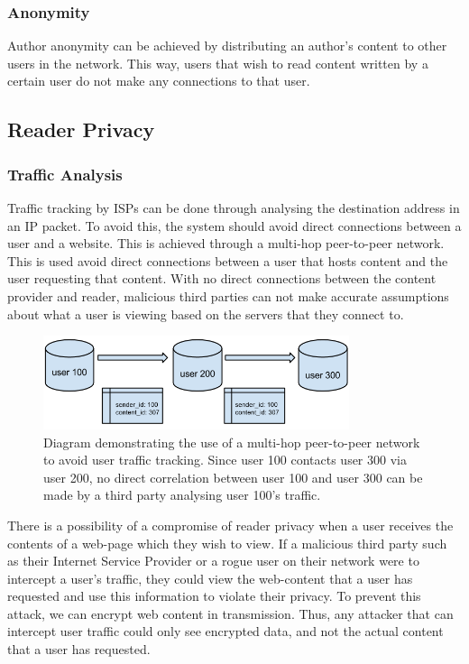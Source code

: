 \subsubsection{Anonymity}
Author anonymity can be achieved by distributing an author's content to other users in the network.
This way, users that wish to read content written by a certain user do not make any connections to that user.


\subsection{Reader Privacy}

\subsubsection{Traffic Analysis}

Traffic tracking by ISPs can be done through analysing the destination address in an IP packet. To avoid this,
the system should avoid direct connections between a user and a website. This is achieved through a multi-hop
peer-to-peer network. This is used avoid direct connections between a user that hosts content and the user
requesting that content. With no direct connections between the content provider and reader, malicious third
parties can not make accurate assumptions about what a user is viewing based on the servers that they connect to.

\begin{figure}[H]
    \centering
    \includegraphics[width=0.8\textwidth]{img/indirection.png}
    \caption{Diagram demonstrating the use of a multi-hop peer-to-peer network to avoid user traffic tracking.
    Since user 100 contacts user 300 via user 200, no direct correlation between user 100 and user 300 can be made
by a third party analysing user 100's traffic.}
    \label{fig:multi-hop}
\end{figure}

There is a possibility of a compromise of reader privacy when a user receives the contents of a web-page which
they wish to view. If a malicious third party such as their Internet Service Provider or a rogue user on their
network were to intercept a user's traffic, they could view the web-content that a user has requested and use this
information to violate their privacy. To prevent this attack, we can encrypt web content in transmission. Thus, any
attacker that can intercept user traffic could only see encrypted data, and not the actual content that a user has
requested.

